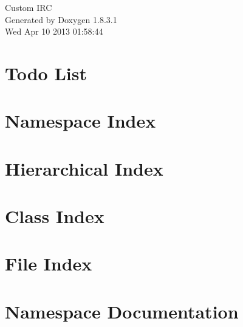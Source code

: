 \documentclass{book}
\begin{document}
\hypersetup{pageanchor=false,citecolor=blue}
\begin{titlepage}
\vspace*{7cm}
\begin{center}
{\Large Custom I\-R\-C }\\
\vspace*{1cm}
{\large Generated by Doxygen 1.8.3.1}\\
\vspace*{0.5cm}
{\small Wed Apr 10 2013 01:58:44}\\
\end{center}
\end{titlepage}
\clearemptydoublepage
{}
\tableofcontents
\clearemptydoublepage
{}
\hypersetup{pageanchor=true,citecolor=blue}
\chapter{Todo List}
\label{todo}
\hypertarget{todo}{}

\chapter{Namespace Index}

\chapter{Hierarchical Index}

\chapter{Class Index}

\chapter{File Index}

\chapter{Namespace Documentation}















\end{document}

